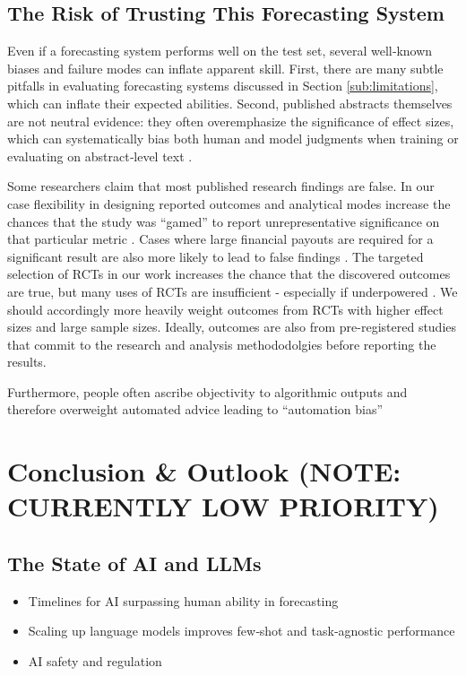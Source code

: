 \documentclass[12pt,a4paper]{article}
\begin{document}
\subsection{The Risk of Trusting This Forecasting System}
\label{subsec:risk_trusting_system}

Even if a forecasting system performs well on the test set, several well‐known biases and failure modes can inflate apparent skill. First, there are many subtle pitfalls in evaluating forecasting systems discussed in Section \ref{sub:limitations}, which can inflate their expected abilities. Second, published abstracts themselves are not neutral evidence: they often overemphasize the significance of effect sizes, which can systematically bias both human and model judgments when training or evaluating on abstract‐level text . 

Some researchers claim that most published research findings are false. In our case flexibility in designing reported outcomes and analytical modes increase the chances that the study was ``gamed'' to report unrepresentative significance on that particular metric . Cases where large financial payouts are required for a significant result are also more likely to lead to false findings . The targeted selection of RCTs in our work increases the chance that the discovered outcomes are true, but many uses of RCTs are insufficient - especially if underpowered . We should accordingly more heavily weight outcomes from RCTs with higher effect sizes and large sample sizes. Ideally, outcomes are also from pre-registered studies that commit to the research and analysis methododolgies before reporting the results.

Furthermore, people often ascribe objectivity to algorithmic outputs and therefore overweight automated advice leading to ``automation bias'' 

\clearpage
\section{Conclusion \& Outlook (NOTE: CURRENTLY LOW PRIORITY)} %
\label{sec:conclusion_outlook}
\subsection{The State of AI and LLMs}
\begin{itemize}
  \item Timelines for AI surpassing human ability in forecasting 
  \item Scaling up language models improves few‑shot and task‑agnostic performance 
  \item AI safety and regulation
\end{itemize}
\end{document}
